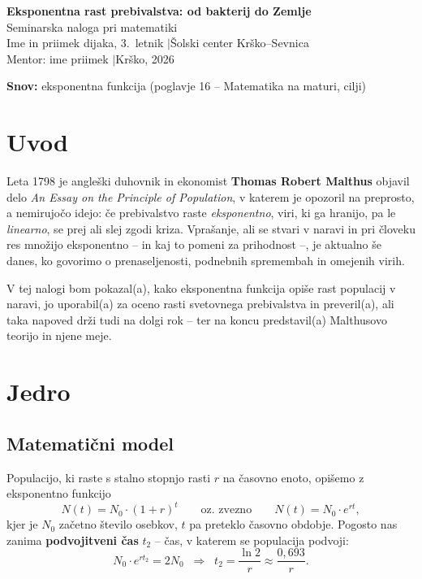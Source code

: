 \documentclass[11pt,a4paper]{article}
\begin{document}
 
\begin{center}
{\Large\bfseries Eksponentna rast prebivalstva: od bakterij do Zemlje}\\[4pt]
\normalsize Seminarska naloga pri matematiki\\
Ime in priimek dijaka, 3.~letnik \quad$\vert$\quad Šolski center Krško--Sevnica\\
Mentor: ime priimek \quad$\vert$\quad Krško, 2026
\end{center}
 
\vspace{4pt}
\noindent\textbf{Snov:} eksponentna funkcija (poglavje 16 -- Matematika na maturi, cilji)
 
\section*{Uvod}
 
Leta 1798 je angleški duhovnik in ekonomist \textbf{Thomas Robert Malthus} objavil delo \textit{An Essay on the Principle of Population}, v katerem je opozoril na preprosto, a nemirujočo idejo: če prebivalstvo raste \emph{eksponentno}, viri, ki ga hranijo, pa le \emph{linearno}, se prej ali slej zgodi kriza. Vprašanje, ali se stvari v naravi in pri človeku res množijo eksponentno -- in kaj to pomeni za prihodnost --, je aktualno še danes, ko govorimo o prenaseljenosti, podnebnih spremembah in omejenih virih.
 
V tej nalogi bom pokazal(a), kako eksponentna funkcija opiše rast populacij v naravi, jo uporabil(a) za oceno rasti svetovnega prebivalstva in preveril(a), ali taka napoved drži tudi na dolgi rok -- ter na koncu predstavil(a) Malthusovo teorijo in njene meje.
 
\section*{Jedro}
 
\subsection*{Matematični model}
 
Populacijo, ki raste s stalno stopnjo rasti $r$ na časovno enoto, opišemo z eksponentno funkcijo
\[
N(t) = N_0 \cdot (1+r)^t \qquad \text{oz.\ zvezno} \qquad N(t) = N_0 \cdot e^{rt},
\]
kjer je $N_0$ začetno število osebkov, $t$ pa preteklo časovno obdobje. Pogosto nas zanima \textbf{podvojitveni čas} $t_2$ -- čas, v katerem se populacija podvoji:
\[
N_0\cdot e^{r t_2} = 2N_0 \;\;\Rightarrow\;\; t_2 = \frac{\ln 2}{r} \approx \frac{0{,}693}{r}.
\]
 
\end{document}
